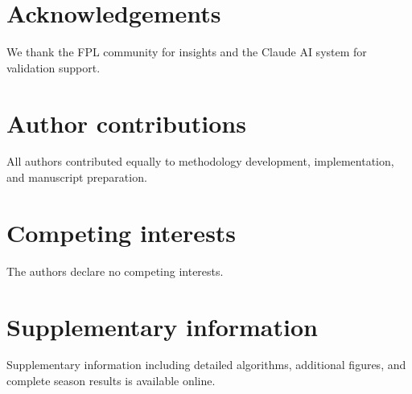 \documentclass[10pt,a4paper,twocolumn]{article}
\begin{document}
\section*{Acknowledgements}

We thank the FPL community for insights and the Claude AI system for validation support.

\section*{Author contributions}

All authors contributed equally to methodology development, implementation, and manuscript preparation.

\section*{Competing interests}

The authors declare no competing interests.

\section*{Supplementary information}

Supplementary information including detailed algorithms, additional figures, and complete season results is available online.
\end{document}
